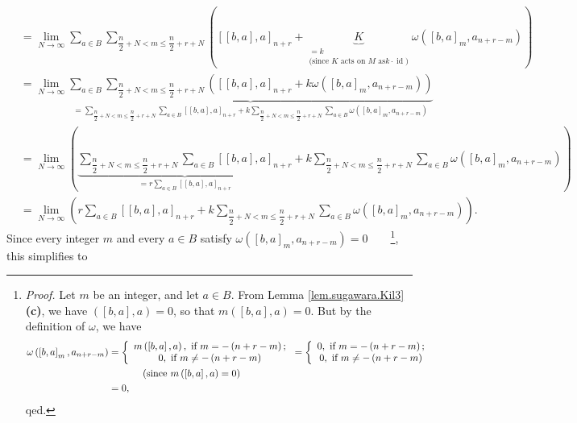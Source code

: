 \documentclass[etingof-lie.tex]{subfiles}
\begin{document}
\begin{align*}
&  =\lim\limits_{N\rightarrow\infty}\sum\limits_{a\in B}\sum\limits_{\dfrac
{n}{2}+N<m\leq\dfrac{n}{2}+r+N}\left(  \left[  \left[  b,a\right]  ,a\right]
_{n+r}+\underbrace{K}_{\substack{=k\\\text{(since }K\text{ acts on }M\text{ as
}k\cdot\operatorname*{id}\text{)}}}\omega\left(  \left[  b,a\right]
_{m},a_{n+r-m}\right)  \right) \\
&  =\lim\limits_{N\rightarrow\infty}\underbrace{\sum\limits_{a\in B}%
\sum\limits_{\dfrac{n}{2}+N<m\leq\dfrac{n}{2}+r+N}\left(  \left[  \left[
b,a\right]  ,a\right]  _{n+r}+k\omega\left(  \left[  b,a\right]
_{m},a_{n+r-m}\right)  \right)  }_{=\sum\limits_{\dfrac{n}{2}+N<m\leq\dfrac
{n}{2}+r+N}\sum\limits_{a\in B}\left[  \left[  b,a\right]  ,a\right]
_{n+r}+k\sum\limits_{\dfrac{n}{2}+N<m\leq\dfrac{n}{2}+r+N}\sum\limits_{a\in
B}\omega\left(  \left[  b,a\right]  _{m},a_{n+r-m}\right)  }\\
&  =\lim\limits_{N\rightarrow\infty}\left(  \underbrace{\sum\limits_{\dfrac
{n}{2}+N<m\leq\dfrac{n}{2}+r+N}\sum\limits_{a\in B}\left[  \left[  b,a\right]
,a\right]  _{n+r}}_{=r\sum\limits_{a\in B}\left[  \left[  b,a\right]
,a\right]  _{n+r}}+k\sum\limits_{\dfrac{n}{2}+N<m\leq\dfrac{n}{2}+r+N}%
\sum\limits_{a\in B}\omega\left(  \left[  b,a\right]  _{m},a_{n+r-m}\right)
\right) \\
&  =\lim\limits_{N\rightarrow\infty}\left(  r\sum\limits_{a\in B}\left[
\left[  b,a\right]  ,a\right]  _{n+r}+k\sum\limits_{\dfrac{n}{2}+N<m\leq
\dfrac{n}{2}+r+N}\sum\limits_{a\in B}\omega\left(  \left[  b,a\right]
_{m},a_{n+r-m}\right)  \right)  .
\end{align*}
Since every integer $m$ and every $a\in B$ satisfy $\omega\left(  \left[
b,a\right]  _{m},a_{n+r-m}\right)  =0$\ \ \ \ \footnote{\textit{Proof.} Let
$m$ be an integer, and let $a\in B$. From Lemma \ref{lem.sugawara.Kil3}
\textbf{(c)}, we have $\left(  \left[  b,a\right]  ,a\right)  =0$, so that
$m\left(  \left[  b,a\right]  ,a\right)  =0$. But by the definition of
$\omega$, we have
\begin{align*}
\omega\left(  \left[  b,a\right]  _{m},a_{n+r-m}\right)   &  =\left\{
\begin{array}
[c]{c}%
m\left(  \left[  b,a\right]  ,a\right)  ,\text{ if }m=-\left(  n+r-m\right)
;\\
0,\text{ if }m\neq-\left(  n+r-m\right)
\end{array}
\right.  =\left\{
\begin{array}
[c]{c}%
0,\text{ if }m=-\left(  n+r-m\right)  ;\\
0,\text{ if }m\neq-\left(  n+r-m\right)
\end{array}
\right. \\
&  \ \ \ \ \ \ \ \ \ \ \left(  \text{since }m\left(  \left[  b,a\right]
,a\right)  =0\right) \\
&  =0,
\end{align*}
qed.}, this simplifies to%
\end{document}
